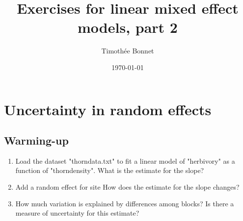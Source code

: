 \documentclass[12pt,a4paper]{scrartcl}\usepackage[]{graphicx}\usepackage[]{color}
\title{Exercises for linear mixed effect models, part 2}
\date{\today}
\author{Timoth\'ee Bonnet}
\begin{document}
\maketitle

\tableofcontents
\ListOfExerciseInToc
{}

\clearpage


\section{Uncertainty in random effects}
\subsection{Warming-up}

\begin{Exercise}[difficulty=1, title={Reading a summary in lme4}]
\begin{enumerate}
  \item Load the dataset "thorndata.txt" to fit a linear model of "herbivory" as a function of "thorndensity". What is the estimate for the slope?\\
  \item Add a random effect for site How does the estimate for the slope changes?\\
  \item How much variation is explained by differences among blocks? Is there a measure of uncertainty for this estimate?
\end{enumerate}
\end{Exercise}
\end{document}
